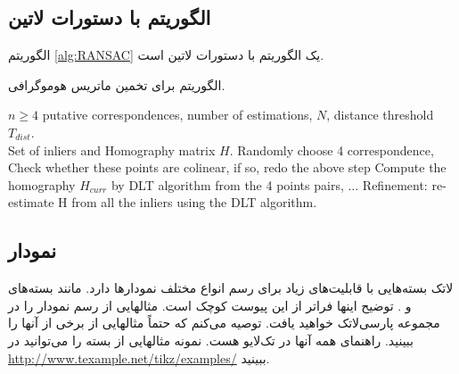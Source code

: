 \subsection{الگوریتم با دستورات لاتین}
الگوریتم \ref{alg:RANSAC} یک الگوریتم با دستورات لاتین است.

\begin{algorithm}[t]
	\onehalfspacing
	\caption{الگوریتم  برای تخمین ماتریس هوموگرافی.} \label{alg:RANSAC}
	\begin{latin}
		\begin{algorithmic}[1]
			\REQUIRE $n\geq4$ putative correspondences, number of estimations, $N$, distance threshold $T_{dist}$.\\
			\ENSURE Set of inliers and Homography matrix $H$.
			\STATE Randomly choose 4 correspondence,
			\STATE Check whether these points are colinear, if so, redo the above step
			\STATE Compute the homography $H_{curr}$ by DLT algorithm from the 4 points pairs,
			\STATE $\ldots$ %
			\ENDFOR
			\STATE Refinement: re-estimate H from all the inliers using the DLT algorithm.
		\end{algorithmic}
	\end{latin}
\end{algorithm}

\subsection{نمودار}
لاتک بسته‌هایی با قابلیت‌های زیاد برای رسم انواع مختلف نمودارها دارد. مانند بسته‌های  و  . توضیح اینها فراتر از این پیوست کوچک است. مثالهایی از رسم نمودار را در مجموعه پارسی‌لاتک خواهید یافت. توصیه می‌کنم که حتماً مثالهایی از برخی از آنها را ببینید. راهنمای همه آنها در تک‌لایو هست. نمونه مثالهایی از بسته  را می‌توانید در \url{http://www.texample.net/tikz/examples/} ببینید.


